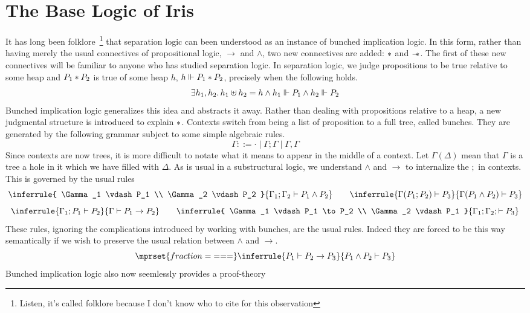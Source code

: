 \documentclass{amsart}
\newcommand{\limplies}{\to}
\newcommand{\forces}{\Vdash}
\begin{document}
\section{The Base Logic of Iris}

It has long been folklore~\footnote{Listen, it's called folklore
  because I don't know who to cite for this observation} that
separation logic can been understood as an instance of bunched
implication logic. In this form, rather than having merely the usual
connectives of propositional logic, $\limplies$ and $\land$, two new
connectives are added: $\ast$ and $\mathrel{-\!\!*}$. The first of these new
connectives will be familiar to anyone who has studied separation
logic. In separation logic, we judge propositions to be true relative
to some heap and $P_1 \ast P_2$ is true of some heap $h$,
$h \forces P_1 \sep P_2$, precisely when the following holds.
\[
  \Exists h_1, h_2. h_1 \uplus h_2 = h
  \land h_1 \forces P_1
  \land h_2 \forces P_2
\]
Bunched implication logic generalizes this idea and abstracts it
away. Rather than dealing with propositions relative to a heap, a new
judgmental structure is introduced to explain $\ast$. Contexts switch
from being a list of proposition to a full tree, called bunches. They
are generated by the following grammar subject to some simple
algebraic rules.
\[
  \Gamma ::= \cdot \mid \Gamma; \Gamma \mid \Gamma, \Gamma
\]
Since contexts are now trees, it is more difficult to notate what it
means to appear in the middle of a context. Let $\Gamma(\Delta)$ mean
that $\Gamma$ is a tree a hole in it which we have filled with
$\Delta$. As is usual in a substructural logic, we understand $\land$
and $\limplies$ to internalize the $;$ in contexts. This is governed
by the usual rules
\[
  \inferrule{
    \Gamma_1 \vdash P_1 \\ \Gamma_2 \vdash P_2
  }{\Gamma_1; \Gamma_2 \vdash P_1 \land P_2}\qquad
  \inferrule{
    \Gamma(P_1; P_2) \vdash P_3
  }{\Gamma(P_1 \land P_2) \vdash P_3}
\]
\[
  \inferrule{
    \Gamma_1; P_1 \vdash P_2
  }{\Gamma \vdash P_1 \limplies P_2}\qquad
  \inferrule{
    \Gamma_1 \vdash P_1 \limplies P_2 \\ \Gamma_2 \vdash P_1
  }{\Gamma_1; \Gamma_2; \vdash P_3}
\]
These rules, ignoring the complications introduced by working with
bunches, are the usual rules. Indeed they are forced to be this way
semantically if we wish to preserve the usual relation between $\land$
and $\limplies$.
\[
  \mprset{fraction={===}}
  \inferrule{
    P_1 \vdash P_2 \limplies P_3
  }{P_1 \land P_2 \vdash P_3}
\]
Bunched implication logic also now seemlessly provides a proof-theory
\end{document}
